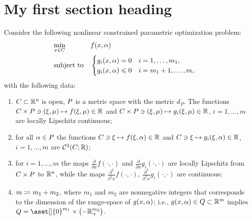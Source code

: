 \documentclass[11pt]{report}
\begin{document}

\maketitle



\section{My first section heading}
Consider the following nonlinear constrained parametric optimization problem:
\begin{align}
        \label{appen:nlmpp}
        \begin{aligned}
            &\operatorname*{min}_{x \in C}  && f(x,\alpha)\\
            &\operatorname{subject\,\,to} && \begin{cases}
            g_i(x,\alpha)=0 \quad i=1,\ldots,m_1,\\
          g_i(x,\alpha) \leqslant 0\quad i=m_1+1,\ldots,m,
            \end{cases}
        \end{aligned}
    \end{align}
with the following data: 
\begin{enumerate}[label=\textup{(\alph*)}, leftmargin=*, widest=b, align=left]
\item \label{mpp:gen_a_0} \(C \subset \mathbb{R}^n\) is open, \(P\) is a metric space with the metric \(d_P\). The functions \(C \times P \ni (\xi,\mu) \mapsto f(\xi,\mu) \in \mathbb{R}\) and \(C \times P \ni (\xi,\mu) \mapsto g_i(\xi,\mu) \in \mathbb{R}\), \(i=1,\ldots,m\) are locally Lipschitz continuous; 

\item \label{mpp:gen_a_1}  for all \(\alpha \in P\) the functions \(C \ni \xi \mapsto f(\xi,\alpha) \in \mathbb{R}\) and \(C \ni \xi \mapsto g_i(\xi,\alpha) \in \mathbb{R}\), \(i=1,\ldots,m\) are \(\mathcal{C}^{2}(C;\mathbb{R})\);

 \item \label{mpp:gen_a_2} for \(i=1,\ldots,m\) the maps \(\frac{\partial}{\partial x} f(\cdot,\cdot)\) and \(\frac{\partial}{\partial x} g_i(\cdot,\cdot)\) are locally Lipschitz from \(C \times P\) to \(\mathbb{R}^n\), while the maps \(\frac{\partial^2}{\partial^2x}f(\cdot,\cdot)\), \(\frac{\partial^2}{\partial^2 x}g_i(\cdot,\cdot)\) are continuous;

 \item \label{mpp:gen_a_3} \(m \coloneqq m_1+m_2\), where \(m_1\) and \(m_2\) are nonnegative integers that corresponds to the dimension of the range-space of \(g(x,\alpha)\); i.e., \(g(x,\alpha) \in Q \subset \mathbb{R}^m\) implies \(Q= \aset[]{0}^{m_1} \times \bigl(-\Rbb_{+}^{m_2}\bigr)\).
 \end{enumerate}
\end{document}
